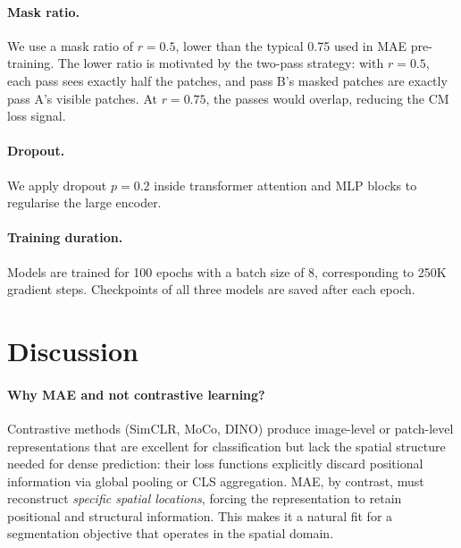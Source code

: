 \documentclass{article}
\begin{document}
\paragraph{Mask ratio.}
We use a mask ratio of $r\!=\!0.5$, lower than the typical 0.75 used in MAE
pre-training.  The lower ratio is motivated by the two-pass strategy: with
$r\!=\!0.5$, each pass sees exactly half the patches, and pass B's masked patches
are exactly pass A's visible patches.  At $r\!=\!0.75$, the passes would overlap,
reducing the CM loss signal.

\paragraph{Dropout.}
We apply dropout $p\!=\!0.2$ inside transformer attention and MLP blocks to
regularise the large encoder.

\paragraph{Training duration.}
Models are trained for 100 epochs with a batch size of 8, corresponding to
250K gradient steps.  Checkpoints of all three models are saved after each epoch.

\section{Discussion}
\label{sec:discussion}

\paragraph{Why MAE and not contrastive learning?}
Contrastive methods (SimCLR, MoCo, DINO) produce image-level or patch-level
representations that are excellent for classification but lack the spatial
structure needed for dense prediction: their loss functions explicitly discard
positional information via global pooling or CLS aggregation.  MAE, by contrast,
must reconstruct \emph{specific spatial locations}, forcing the representation
to retain positional and structural information.  This makes it a natural fit
for a segmentation objective that operates in the spatial domain.
\end{document}
